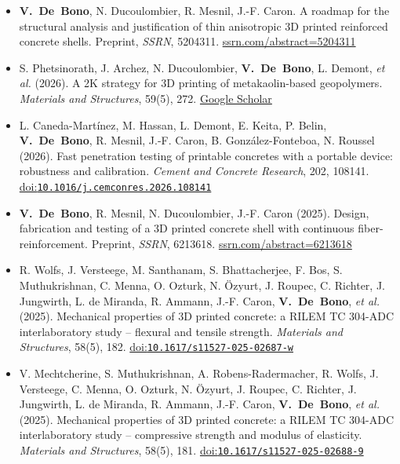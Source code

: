 \documentclass[11pt,a4paper]{article}
\newcommand{\doi}[1]{\href{https://doi.org/#1}{doi:\nolinkurl{#1}}}
\newcommand{\me}{\textbf{V.~De~Bono}}
\newenvironment{publis}[1]%
  {\begin{itemize}[label={}, leftmargin=1.2em, labelwidth=0pt, labelsep=0pt,
     itemindent=-1.2em, itemsep=0.45em, topsep=0.3em]}%
  {\end{itemize}}
\begin{document}
\begin{publis}{A}
  \item \me, N. Ducoulombier, R. Mesnil, J.-F. Caron.
  A roadmap for the structural analysis and justification of thin anisotropic 3D printed reinforced concrete shells.
  Preprint, \emph{SSRN}, 5204311.
  \href{https://papers.ssrn.com/sol3/papers.cfm?abstract_id=5204311}{ssrn.com/abstract=5204311}

  \item S. Phetsinorath, J. Archez, N. Ducoulombier, \me, L. Demont, \emph{et al.} (2026).
  A 2K strategy for 3D printing of metakaolin-based geopolymers.
  \emph{Materials and Structures}, 59(5), 272.
  \href{https://scholar.google.com/scholar?q=A+2K+strategy+for+3D+printing+of+metakaolin-based+geopolymers}{Google Scholar}

  \item L. Caneda-Martínez, M. Hassan, L. Demont, E. Keita, P. Belin, \me, R. Mesnil, J.-F. Caron, B. González-Fonteboa, N. Roussel (2026).
  Fast penetration testing of printable concretes with a portable device: robustness and calibration.
  \emph{Cement and Concrete Research}, 202, 108141.
  \doi{10.1016/j.cemconres.2026.108141}

  \item \me, R. Mesnil, N. Ducoulombier, J.-F. Caron (2025).
  Design, fabrication and testing of a 3D printed concrete shell with continuous fiber-reinforcement.
  Preprint, \emph{SSRN}, 6213618.
  \href{https://papers.ssrn.com/sol3/papers.cfm?abstract_id=6213618}{ssrn.com/abstract=6213618}

  \item R. Wolfs, J. Versteege, M. Santhanam, S. Bhattacherjee, F. Bos, S. Muthukrishnan, C. Menna, O. Ozturk, N. Özyurt, J. Roupec, C. Richter, J. Jungwirth, L. de Miranda, R. Ammann, J.-F. Caron, \me, \emph{et al.} (2025).
  Mechanical properties of 3D printed concrete: a RILEM TC 304-ADC interlaboratory study -- flexural and tensile strength.
  \emph{Materials and Structures}, 58(5), 182.
  \doi{10.1617/s11527-025-02687-w}

  \item V. Mechtcherine, S. Muthukrishnan, A. Robens-Radermacher, R. Wolfs, J. Versteege, C. Menna, O. Ozturk, N. Özyurt, J. Roupec, C. Richter, J. Jungwirth, L. de Miranda, R. Ammann, J.-F. Caron, \me, \emph{et al.} (2025).
  Mechanical properties of 3D printed concrete: a RILEM TC 304-ADC interlaboratory study -- compressive strength and modulus of elasticity.
  \emph{Materials and Structures}, 58(5), 181.
  \doi{10.1617/s11527-025-02688-9}


\end{publis}
\end{document}
